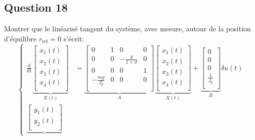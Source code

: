 \documentclass[class=article, crop=false]{standalone}
\begin{document}
\subsection{Question 18}
\begin{exercise}
    Montrer que le linéarisé tangent du système, avec mesure, autour de la position d'équilibre $r_{\text{ref}} = 0$ s'écrit:
    \begin{equation}
        \left\{
        \begin{aligned}
            \frac{\text{d}}{\text{dt}} 
            \underbrace{
            \begin{bmatrix}
                x_{1}(t)\\
                x_{2}(t)\\
                x_{3}(t)\\
                x_{4}(t)\\
            \end{bmatrix}}_{X(t)}
            &=
            \underbrace{
            \begin{bmatrix}
                0 & 1 & 0 & 0\\
                0 & 0 & -\frac{g}{1 + \sigma} & 0\\
                0 & 0 & 0 & 1\\
                -\frac{mg}{J_p} & 0 & 0 & 0\\
            \end{bmatrix}}_{A}
            \underbrace{
            \begin{bmatrix}
                x_{1}(t)\\
                x_{2}(t)\\
                x_{3}(t)\\
                x_{4}(t)\\
            \end{bmatrix}}_{X(t)}
            +
            \underbrace{
            \begin{bmatrix}
                0\\
                0\\
                0\\
                \frac{1}{J_p}\\
            \end{bmatrix}}_{B}
            \delta u(t)
            \\
            \underbrace{
            \begin{bmatrix}
                y_1(t)\\
                y_2(t)\\

\end{bmatrix}}
\end{aligned}
\end{equation}
\end{exercise}
\end{document}
